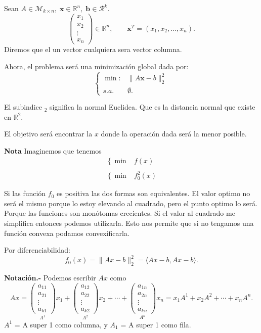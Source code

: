 \begin{ejem}
Sean $A\in \mathcal{M}_{k\times n},\; \textbf{x}\in \mathbb{R}^n,\; \textbf{b}\in \mathcal{R}^k$.
$$
\begin{pmatrix}
    x_1\\
    x_2\\
    \vdots\\
    x_n
\end{pmatrix}
\in \mathbb{R}^n,
\qquad 
\textbf{x}^T=(x_1,x_2,\ldots,x_n).
$$
Diremos que el un vector cualquiera sera vector columna.

Ahora, el problema será una minimización global dada por:
$$
\left\{
\begin{array}{rl}
    \min: &\|A\textbf{x}-b\|^2_2\\
    s.a. & \emptyset.
\end{array}
\right.
$$

El subindice $_2$ significa la normal Euclidea. Que es la distancia normal que existe en $\mathbb{R}^2.$

El objetivo será encontrar la $x$ donde la operación dada será la menor posible.

\textbf{Nota}
Imaginemos que tenemos 
$$
\begin{array}{rl}
    \left\{\min\right. & f(x)\\\\
    \left\{ \min \right. & f_0^2(x)
\end{array}
$$

Si las función $f_0$ es positiva las dos formas son equivalentes. El valor optimo no será el mismo porque lo estoy elevando al cuadrado, pero el punto optimo lo será. Porque las funciones son monótomas crecientes. Si el valor al cuadrado me simplifica entonces podemos utilizarla. Esto nos permite que si no tengamos una función convexa podamos convexificarla.

Por diferenciabilidad:
$$f_0(x)=\|Ax-b\|_2^2 = \langle Ax-b,Ax-b\rangle.$$


\textbf{Notación.-} Podemos escribir $Ax$ como
$$
Ax = 
\underset{A^1}{
\begin{pmatrix}
    a_{11}\\
    a_{21}\\
    \vdots\\
    a_{k1}
\end{pmatrix}}
x_1+
\underset{A^2}{
\begin{pmatrix}
	a_{12}\\
	a_{22}\\
	\vdots\\
	a_{k2}
\end{pmatrix}}
x_2+
\cdots +
\underset{A^n}{
\begin{pmatrix}
	a_{1n}\\
	a_{2n}\\
	\vdots\\
	a_{kn}
\end{pmatrix}}
x_n
=
x_1A^1+x_2A^2+\cdots+x_nA^n.
$$
$A^1$ = A super 1 como columna, y $A_1$ = A super 1 como fila.


\end{ejem}
